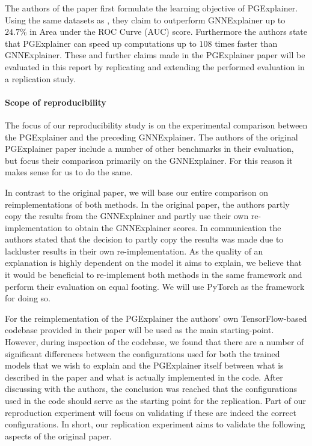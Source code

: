 \documentclass{article}
\begin{document}
The authors of the paper first formulate the learning objective of PGExplainer. Using the same datasets as \cite{ying2019gnnexplainer}, they claim to outperform GNNExplainer up to $24.7\%$ in Area under the ROC Curve (AUC) \cite{Hanley1982roc-auc} score. Furthermore the authors state that PGExplainer can speed up computations up to $108$ times faster than GNNExplainer. These and further claims made in the PGExplainer paper will be evaluated in this report by replicating and extending the performed evaluation in a replication study.

\paragraph{Scope of reproducibility}\label{sec:scope}
The focus of our reproducibility study is on the experimental comparison between the PGExplainer and the preceding GNNExplainer. The authors of the original PGExplainer paper include a number of other benchmarks in their evaluation, but focus their comparison primarily on the GNNExplainer. For this reason it makes sense for us to do the same. 

In contrast to the original paper, we will base our entire comparison on reimplementations of both methods. In the original paper, the authors partly copy the results from the GNNExplainer and partly use their own re-implementation to obtain the GNNExplainer scores. In communication the authors stated that the decision to partly copy the results was made due to lackluster results in their own re-implementation. As the quality of an explanation is highly dependent on the model it aims to explain, we believe that it would be beneficial to re-implement both methods in the same framework and perform their evaluation on equal footing. We will use PyTorch as the framework for doing so. 

For the reimplementation of the PGExplainer the authors' own TensorFlow-based codebase provided in their paper will be used as the main starting-point. However, during inspection of the codebase, we found that there are a number of significant differences between the configurations used for both the trained models that we wish to explain and the PGExplainer itself between what is described in the paper and what is actually implemented in the code. After discussing with the authors, the conclusion was reached that the configurations used in the code should serve as the starting point for the replication. Part of our reproduction experiment will focus on validating if these are indeed the correct configurations. 
In short, our replication experiment aims to validate the following aspects of the original paper.
\end{document}
